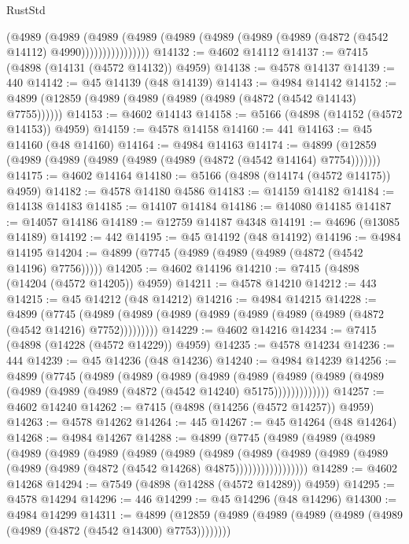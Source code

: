 \begin{lexlean}{RustStd}
\begin{coremodule}
                  (@4989
                    (@4989
                      (@4989
                        (@4989
                          (@4989 (@4989 (@4989 (@4989 (@4872 (@4542 @14112) @4990))))))))))))))))
@14132 := @4602 @14112
@14137 := @7415 (@4898 (@14131 (@4572 @14132)) @4959)
@14138 := @4578 @14137
@14139 := 440
@14142 := @45 @14139 (@48 @14139)
@14143 := @4984 @14142
@14152 := @4899 (@12859 (@4989 (@4989 (@4989 (@4989 (@4872 (@4542 @14143) @7755))))))
@14153 := @4602 @14143
@14158 := @5166 (@4898 (@14152 (@4572 @14153)) @4959)
@14159 := @4578 @14158
@14160 := 441
@14163 := @45 @14160 (@48 @14160)
@14164 := @4984 @14163
@14174 := @4899 (@12859 (@4989 (@4989 (@4989 (@4989 (@4989 (@4872 (@4542 @14164) @7754)))))))
@14175 := @4602 @14164
@14180 := @5166 (@4898 (@14174 (@4572 @14175)) @4959)
@14182 := @4578 @14180 @4586
@14183 := @14159 @14182
@14184 := @14138 @14183
@14185 := @14107 @14184
@14186 := @14080 @14185
@14187 := @14057 @14186
@14189 := @12759 @14187 @4348
@14191 := @4696 (@13085 @14189)
@14192 := 442
@14195 := @45 @14192 (@48 @14192)
@14196 := @4984 @14195
@14204 := @4899 (@7745 (@4989 (@4989 (@4989 (@4872 (@4542 @14196) @7756)))))
@14205 := @4602 @14196
@14210 := @7415 (@4898 (@14204 (@4572 @14205)) @4959)
@14211 := @4578 @14210
@14212 := 443
@14215 := @45 @14212 (@48 @14212)
@14216 := @4984 @14215
@14228 := @4899
    (@7745 (@4989 (@4989 (@4989 (@4989 (@4989 (@4989 (@4989 (@4872 (@4542 @14216) @7752)))))))))
@14229 := @4602 @14216
@14234 := @7415 (@4898 (@14228 (@4572 @14229)) @4959)
@14235 := @4578 @14234
@14236 := 444
@14239 := @45 @14236 (@48 @14236)
@14240 := @4984 @14239
@14256 := @4899
    (@7745
      (@4989
        (@4989
          (@4989
            (@4989
              (@4989
                (@4989 (@4989 (@4989 (@4989 (@4989 (@4989 (@4872 (@4542 @14240) @5175)))))))))))))
@14257 := @4602 @14240
@14262 := @7415 (@4898 (@14256 (@4572 @14257)) @4959)
@14263 := @4578 @14262
@14264 := 445
@14267 := @45 @14264 (@48 @14264)
@14268 := @4984 @14267
@14288 := @4899
    (@7745
      (@4989
        (@4989
          (@4989
            (@4989
              (@4989
                (@4989
                  (@4989
                    (@4989
                      (@4989
                        (@4989
                          (@4989
                            (@4989 (@4989 (@4989 (@4989 (@4872 (@4542 @14268) @4875)))))))))))))))))
@14289 := @4602 @14268
@14294 := @7549 (@4898 (@14288 (@4572 @14289)) @4959)
@14295 := @4578 @14294
@14296 := 446
@14299 := @45 @14296 (@48 @14296)
@14300 := @4984 @14299
@14311 := @4899
    (@12859 (@4989 (@4989 (@4989 (@4989 (@4989 (@4989 (@4872 (@4542 @14300) @7753))))))))

\end{coremodule}
\end{lexlean}
